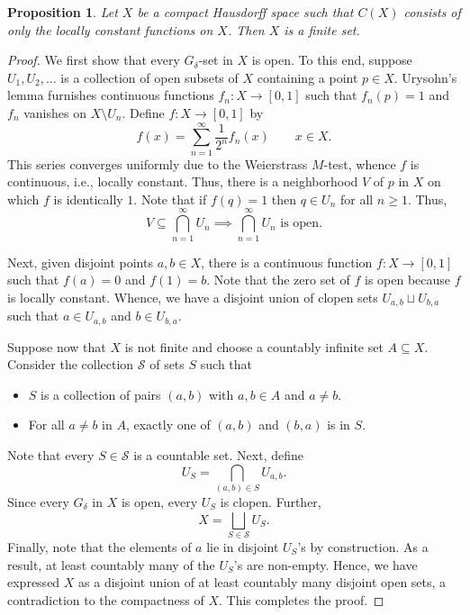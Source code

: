 \documentclass[12pt]{article}
\theoremstyle{thmstyle}
\newtheorem{proposition}[theorem]{Proposition}
\theoremstyle{defstyle}
\newcommand{\scrS}{\mathscr S}
\renewcommand{\ge}{\geqslant}
\begin{document}
\begin{proposition}
    Let $X$ be a compact Hausdorff space such that $C(X)$ consists of only the locally constant functions on $X$. Then $X$ is a finite set.
\end{proposition}
\begin{proof}
    We first show that every $G_\delta$-set in $X$ is open. To this end, suppose $U_1, U_2,\dots$ is a collection of open subsets of $X$ containing a point $p\in X$. Urysohn's lemma furnishes continuous functions $f_n: X\to[0, 1]$ such that $f_n(p) = 1$ and $f_n$ vanishes on $X\setminus U_n$. Define $f: X\to[0, 1]$ by 
    \begin{equation*}
        f(x) = \sum_{n = 1}^\infty\frac{1}{2^n}f_n(x)\qquad x\in X.
    \end{equation*}
    This series converges uniformly due to the Weierstrass $M$-test, whence $f$ is continuous, i.e., locally constant. Thus, there is a neighborhood $V$ of $p$ in $X$ on which $f$ is identically $1$. Note that if $f(q) = 1$ then $q\in U_n$ for all $n\ge 1$. Thus, 
    \begin{equation*}
        V\subseteq\bigcap_{n = 1}^\infty U_n\implies\bigcap_{n = 1}^\infty U_n\text{ is open}.
    \end{equation*}

    Next, given disjoint points $a,b\in X$, there is a continuous function $f:X\to [0,1]$ such that $f(a) = 0$ and $f(1) = b$. Note that the zero set of $f$ is open because $f$ is locally constant. Whence, we have a disjoint union of clopen sets $U_{a,b}\sqcup U_{b, a}$ such that $a\in U_{a,b}$ and $b\in U_{b, a}$.

    Suppose now that $X$ is not finite and choose a countably infinite set $A\subseteq X$. Consider the collection $\scrS$ of sets $S$ such that
    \begin{itemize}
        \item $S$ is a collection of pairs $(a, b)$ with $a, b\in A$ and $a\ne b$. 
        \item For all $a\ne b$ in $A$, exactly one of $(a, b)$ and $(b, a)$ is in $S$.
    \end{itemize}
    Note that every $S\in\mathscr S$ is a countable set. Next, define 
    \begin{equation*}
        U_S = \bigcap_{(a, b)\in S} U_{a, b}.
    \end{equation*}
    Since every $G_\delta$ in $X$ is open, every $U_S$ is clopen. Further, 
    \begin{equation*}
        X = \bigsqcup_{S\in\mathscr S} U_S.
    \end{equation*}
    Finally, note that the elements of $a$ lie in disjoint $U_S$'s by construction. As a result, at least countably many of the $U_S$'s are non-empty. Hence, we have expressed $X$ as a disjoint union of at least countably many disjoint open sets, a contradiction to the compactness of $X$. This completes the proof.
\end{proof}
\end{document}
